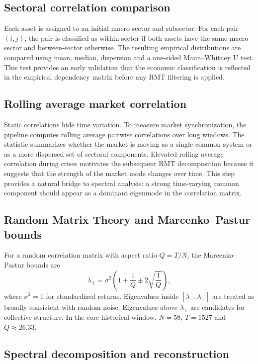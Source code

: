 \subsection{Sectoral correlation comparison}

Each asset is assigned to an initial macro sector and subsector. For each pair $(i,j)$, the pair is classified as within-sector if both assets have the same macro sector and between-sector otherwise. The resulting empirical distributions are compared using mean, median, dispersion and a one-sided Mann--Whitney U test. This test provides an early validation that the economic classification is reflected in the empirical dependency matrix before any RMT filtering is applied.

\subsection{Rolling average market correlation}

Static correlations hide time variation. To measure market synchronization, the pipeline computes rolling average pairwise correlations over long windows. The statistic summarizes whether the market is moving as a single common system or as a more dispersed set of sectoral components. Elevated rolling average correlation during crises motivates the subsequent RMT decomposition because it suggests that the strength of the market mode changes over time. This step provides a natural bridge to spectral analysis: a strong time-varying common component should appear as a dominant eigenmode in the correlation matrix.

\subsection{Random Matrix Theory and Marcenko--Pastur bounds}

For a random correlation matrix with aspect ratio $Q=T/N$, the Marcenko--Pastur bounds are
\begin{equation}
\lambda_{\pm} = \sigma^2 \left(1 + \frac{1}{Q} \pm 2\sqrt{\frac{1}{Q}}\right),
\end{equation}
where $\sigma^2=1$ for standardized returns. Eigenvalues inside $[\lambda_-,\lambda_+]$ are treated as broadly consistent with random noise. Eigenvalues above $\lambda_+$ are candidates for collective structure. In the core historical window, $N=58$, $T=1527$ and $Q \approx 26.33$.

\subsection{Spectral decomposition and reconstruction}

